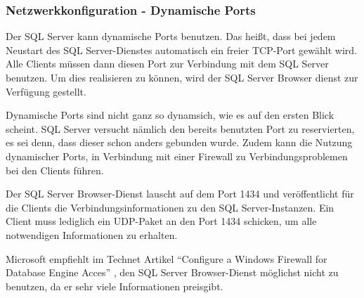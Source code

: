         \subsubsection{Netzwerkkonfiguration - Dynamische Ports}
          Der SQL Server kann dynamische Ports benutzen. Das heißt, dass bei jedem
          Neustart des SQL Server-Dienstes automatisch ein freier TCP-Port gewählt
          wird. Alle Clients müssen dann diesen Port zur Verbindung mit dem SQL
          Server benutzen. Um dies realisieren zu können, wird der SQL Server
          Browser dienst zur Verfügung gestellt.
          \begin{merke}
            Dynamische Ports sind nicht ganz so dynamsich, wie es auf den ersten
            Blick scheint. SQL Server versucht nämlich den bereits
            benutzten Port zu reservierten, es sei denn, dass dieser schon
            anders gebunden wurde. Zudem kann die Nutzung dynamischer Ports,
            in Verbindung mit einer Firewall zu Verbindungsproblemen bei den
            Clients führen.
          \end{merke}
          Der SQL Server Browser-Dienst lauscht auf dem Port 1434 und 
          veröffentlicht für die Clients die Verbindungsinformationen zu den SQL
          Server-Instanzen. Ein Client muss lediglich ein UDP-Paket an den Port
          1434 schicken, um alle notwendigen Informationen zu erhalten. 
          \begin{merke}
            Microsoft empfiehlt im Technet Artikel \enquote{Configure a Windows
            Firewall for Database Engine Acces} \parencite{ms175043}, den
            SQL Server Browser-Dienst möglichst nicht zu benutzen, da er sehr
            viele Informationen preisgibt.
          \end{merke}
